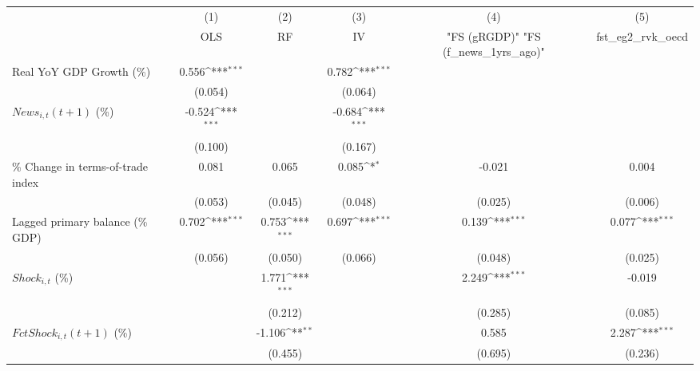 {
\def\sym#1{\ifmmode^{#1}\else\(^{#1}\)\fi}
\begin{tabular}{l*{5}{c}}
\toprule
                    &\multicolumn{1}{c}{(1)}&\multicolumn{1}{c}{(2)}&\multicolumn{1}{c}{(3)}&\multicolumn{1}{c}{(4)}&\multicolumn{1}{c}{(5)}\\
                    &\multicolumn{1}{c}{OLS}&\multicolumn{1}{c}{RF}&\multicolumn{1}{c}{IV}&\multicolumn{1}{c}{ "FS (gRGDP)"  "FS (f_news_1yrs_ago)" }&\multicolumn{1}{c}{fst_eg2_rvk_oecd}\\
\midrule
Real YoY GDP Growth (\%)&       0.556\sym{***}&                     &       0.782\sym{***}&                     &                     \\
                    &     (0.054)         &                     &     (0.064)         &                     &                     \\
\addlinespace
$ News_{i,t}(t+1)$ (\%)&      -0.524\sym{***}&                     &      -0.684\sym{***}&                     &                     \\
                    &     (0.100)         &                     &     (0.167)         &                     &                     \\
\addlinespace
\% Change in terms-of-trade index&       0.081         &       0.065         &       0.085\sym{*}  &      -0.021         &       0.004         \\
                    &     (0.053)         &     (0.045)         &     (0.048)         &     (0.025)         &     (0.006)         \\
\addlinespace
Lagged primary balance (\% GDP)&       0.702\sym{***}&       0.753\sym{***}&       0.697\sym{***}&       0.139\sym{***}&       0.077\sym{***}\\
                    &     (0.056)         &     (0.050)         &     (0.066)         &     (0.048)         &     (0.025)         \\
\addlinespace
$ Shock_{i,t}$ (\%) &                     &       1.771\sym{***}&                     &       2.249\sym{***}&      -0.019         \\
                    &                     &     (0.212)         &                     &     (0.285)         &     (0.085)         \\
\addlinespace
$ FctShock_{i,t}(t+1)$ (\%)&                     &      -1.106\sym{**} &                     &       0.585         &       2.287\sym{***}\\
                    &                     &     (0.455)         &                     &     (0.695)         &     (0.236)         \\

\end{tabular}}
